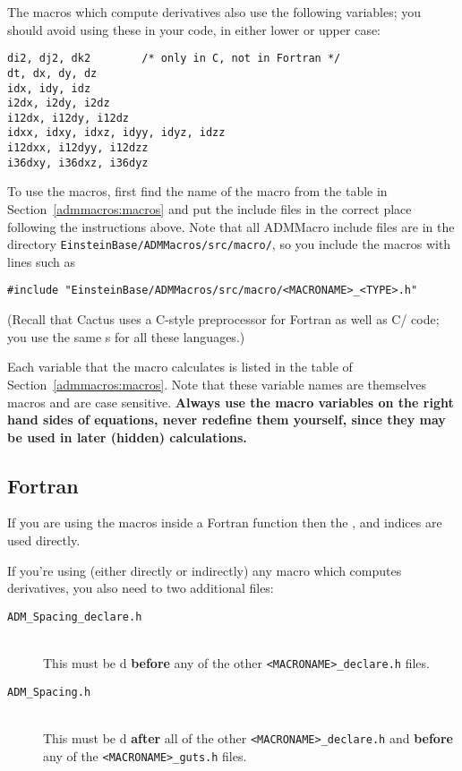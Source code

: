 The macros which compute derivatives also use the following variables;
you should avoid using these in your code, in either lower or upper case:
\begin{verbatim}
di2, dj2, dk2        /* only in C, not in Fortran */
dt, dx, dy, dz
idx, idy, idz
i2dx, i2dy, i2dz
i12dx, i12dy, i12dz
idxx, idxy, idxz, idyy, idyz, idzz
i12dxx, i12dyy, i12dzz
i36dxy, i36dxz, i36dyz
\end{verbatim}

To use the macros, first find the name of the macro from the table in
Section~\ref{admmacros:macros} and put the include files in the
correct place following the instructions above. Note that all ADMMacro
include files are in the directory \texttt{EinsteinBase/ADMMacros/src/macro/},
so you include the macros with lines such as
\begin{verbatim}
#include "EinsteinBase/ADMMacros/src/macro/<MACRONAME>_<TYPE>.h"
\end{verbatim}
(Recall that Cactus uses a C-style preprocessor for Fortran as well as
C/\Cplusplus{} code; you use the same s for all these
languages.)

Each variable that the macro calculates is listed in the table of
Section~\ref{admmacros:macros}.  Note that these variable names are
themselves macros and are case sensitive. \textbf{Always use the macro
variables on the right hand sides of equations, never redefine them
yourself, since they may be used in later (hidden) calculations.}

\subsection{Fortran}

If you are using the macros inside a Fortran function then the
,  and  indices are used directly.

If you're using (either directly or indirectly) any macro which computes
derivatives, you also need to  two additional files:
\begin{description}
\item[\texttt{ADM\_Spacing\_declare.h}]\mbox{}\\
	This must be d \textbf{before} any of the
	other \texttt{<MACRONAME>\_declare.h} files.
\item[\texttt{ADM\_Spacing.h}]\mbox{}\\
	This must be d \textbf{after} all of the
	other \texttt{<MACRONAME>\_declare.h} and \textbf{before}
	any of the \texttt{<MACRONAME>\_guts.h} files.
\end{description}

